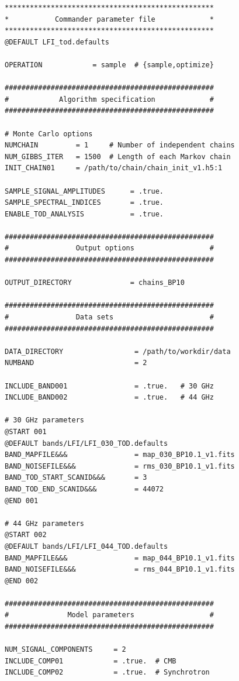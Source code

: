 \documentclass[twocolumn]{aa}
\begin{document}
\begin{lstfloat}[t]
  {\scriptsize
    \begin{tcolorbox}
\begin{lstlisting}
**************************************************
*           Commander parameter file             *
**************************************************
@DEFAULT LFI_tod.defaults

OPERATION            = sample  # {sample,optimize}

##################################################
#            Algorithm specification             #
##################################################

# Monte Carlo options
NUMCHAIN         = 1     # Number of independent chains
NUM_GIBBS_ITER   = 1500  # Length of each Markov chain
INIT_CHAIN01     = /path/to/chain/chain_init_v1.h5:1

SAMPLE_SIGNAL_AMPLITUDES      = .true.
SAMPLE_SPECTRAL_INDICES       = .true.
ENABLE_TOD_ANALYSIS           = .true.

##################################################
#                Output options                  #
##################################################

OUTPUT_DIRECTORY              = chains_BP10

##################################################
#                Data sets                       #
##################################################

DATA_DIRECTORY                 = /path/to/workdir/data
NUMBAND                        = 2

INCLUDE_BAND001                = .true.   # 30 GHz
INCLUDE_BAND002                = .true.   # 44 GHz

# 30 GHz parameters
@START 001
@DEFAULT bands/LFI/LFI_030_TOD.defaults
BAND_MAPFILE&&&                = map_030_BP10.1_v1.fits
BAND_NOISEFILE&&&              = rms_030_BP10.1_v1.fits
BAND_TOD_START_SCANID&&&       = 3
BAND_TOD_END_SCANID&&&         = 44072
@END 001

# 44 GHz parameters
@START 002
@DEFAULT bands/LFI/LFI_044_TOD.defaults
BAND_MAPFILE&&&                = map_044_BP10.1_v1.fits
BAND_NOISEFILE&&&              = rms_044_BP10.1_v1.fits
@END 002

##################################################
#              Model parameters                  #
##################################################

NUM_SIGNAL_COMPONENTS     = 2
INCLUDE_COMP01            = .true.  # CMB 
INCLUDE_COMP02            = .true.  # Synchrotron


\end{lstlisting}
\end{tcolorbox}}
\end{lstfloat}
\end{document}
